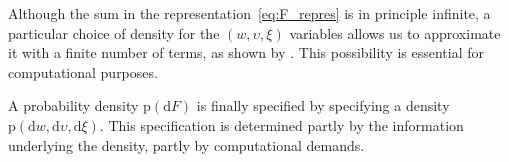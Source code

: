 \documentclass[\ifafour a4paper,12pt,\else a5paper,10pt,\fi%
onecolumn,oneside,article,%
british%
]{memoir}
\makeatletter
\theoremstyle{remark}
\theoremstyle{innote}
\def\sum{\DOTSI\sumop\slimits@}
\def\prod{\DOTSI\prodop\slimits@}
\newcommand*{\di}{\mathrm{d}}%
\newcommand*{\defd}{\coloneqq}
\newcommand*{\p}{\mathrm{p}}%
\renewcommand*{\|}[1][]{\nonscript\:#1\vert\nonscript\:\mathopen{}}
\newcommand*{\eqn}{eq.}%
\makeatother
\begin{document}
Although the sum in the representation~\eqref{eq:F_repres} is in principle infinite, a particular choice of density for the $(w,\upsilon,\xi)$ variables allows us to approximate it with a finite number of terms, as shown by \textcites{ishwaranetal2002b}. This possibility is essential for computational purposes.






A probability density $\p(\di F)$ is finally specified by specifying a density $\p(\di w, \di\upsilon, \di\xi)$. This specification is determined partly by the information underlying the density, partly by computational demands.
\end{document}
